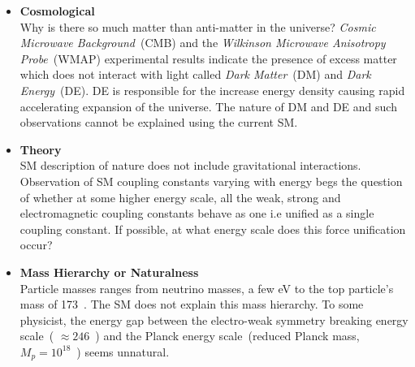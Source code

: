 {\begin{itemize}
\item \textbf{Cosmological} \mbox{}\\
Why is there so much matter than anti-matter in the universe? \textit{Cosmic Microwave Background}~(CMB) and the \textit{Wilkinson Microwave Anisotropy Probe}~(WMAP) experimental results indicate the presence of excess matter which does not interact with light called \textit{Dark Matter}~(DM) and \textit{Dark Energy}~(DE). DE is responsible for the increase energy density causing rapid accelerating expansion  of the universe. The nature of DM and DE and such observations cannot be explained using the current SM.
\item \textbf{Theory} \mbox{}\\
SM description of nature does not include gravitational interactions.
Observation of SM coupling constants varying with energy begs the question of whether at some higher energy scale, all the weak, strong and electromagnetic coupling constants behave as one i.e unified as a single coupling constant. If possible, at what energy scale does this force unification occur?

\item \textbf{Mass Hierarchy or Naturalness} \mbox{}\\
Particle masses ranges from neutrino masses, a few eV to the \textsf{top} particle's mass of 173~\GeVcc.
The SM does not explain this mass hierarchy.
To some physicist, the energy gap between the electro-weak symmetry breaking energy scale~( $\approx 246$~\GeV) and the Planck energy scale~(reduced Planck mass, $M_{p} = 10^{18}$~\GeV) seems unnatural.


\end{itemize}}
